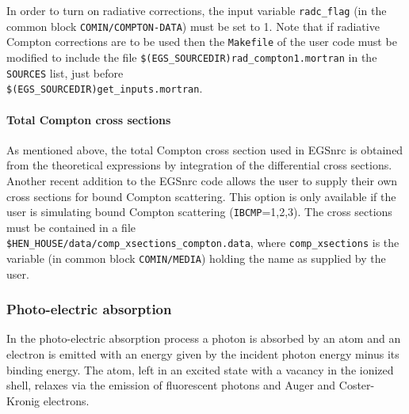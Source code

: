 In order to turn on radiative corrections, the input variable
{\tt radc\_flag} (in the common block
{\tt COMIN/COMPTON-DATA}) must be set to 1.
Note that if radiative 
Compton corrections
are to be used then the {\tt Makefile} of the user code must
be modified to include the file {\tt \$(EGS\_SOURCEDIR)rad\_compton1.mortran}
in the {\tt SOURCES} list, just before\\
 {\tt \$(EGS\_SOURCEDIR)get_inputs.mortran}.

\paragraph{Total Compton cross sections}\hfill
\label{comp_xsect}

As mentioned above, the total Compton cross section used in EGSnrc is obtained 
from the theoretical expressions by integration of the differential cross sections. 
Another recent addition to the EGSnrc code allows the user to supply their
own cross sections for bound Compton scattering. This option is only available
if the user is simulating bound Compton scattering 
({\tt IBCMP}=1,2,3).  The cross sections
must be contained in a file\\
 {\tt \$HEN\_HOUSE/data/comp\_xsections\_compton.data},
where {\tt comp\_xsections} is the variable 
(in common block {\tt COMIN/MEDIA}) holding the name as supplied
by the user.

\subsubsection{Photo-electric absorption}
\setcounter{equation}{0}
\label{photo}

In the photo-electric absorption process a photon is 
absorbed by an atom and an electron 
is emitted with an energy given by the incident photon 
energy minus its binding energy. 
The atom, left in an excited state with a vacancy in the 
ionized shell, relaxes via the emission of fluorescent photons and 
Auger and Coster-Kronig electrons.  

